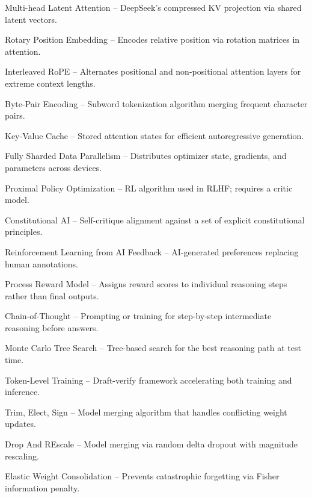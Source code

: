 \begin{description}[style=nextline, leftmargin=2cm]
  \item[MLA] Multi-head Latent Attention -- DeepSeek's compressed KV projection via shared latent vectors.
  \item[RoPE] Rotary Position Embedding -- Encodes relative position via rotation matrices in attention.
  \item[iRoPE] Interleaved RoPE -- Alternates positional and non-positional attention layers for extreme context lengths.
  \item[BPE] Byte-Pair Encoding -- Subword tokenization algorithm merging frequent character pairs.
  \item[KV Cache] Key-Value Cache -- Stored attention states for efficient autoregressive generation.
  \item[FSDP] Fully Sharded Data Parallelism -- Distributes optimizer state, gradients, and parameters across devices.
  \item[PPO] Proximal Policy Optimization -- RL algorithm used in RLHF; requires a critic model.
  \item[CAI] Constitutional AI -- Self-critique alignment against a set of explicit constitutional principles.
  \item[RLAIF] Reinforcement Learning from AI Feedback -- AI-generated preferences replacing human annotations.
  \item[PRM] Process Reward Model -- Assigns reward scores to individual reasoning steps rather than final outputs.
  \item[CoT] Chain-of-Thought -- Prompting or training for step-by-step intermediate reasoning before answers.
  \item[MCTS] Monte Carlo Tree Search -- Tree-based search for the best reasoning path at test time.
  \item[TLT] Token-Level Training -- Draft-verify framework accelerating both training and inference.
  \item[TIES] Trim, Elect, Sign -- Model merging algorithm that handles conflicting weight updates.
  \item[DARE] Drop And REscale -- Model merging via random delta dropout with magnitude rescaling.
  \item[EWC] Elastic Weight Consolidation -- Prevents catastrophic forgetting via Fisher information penalty.
\end{description}
